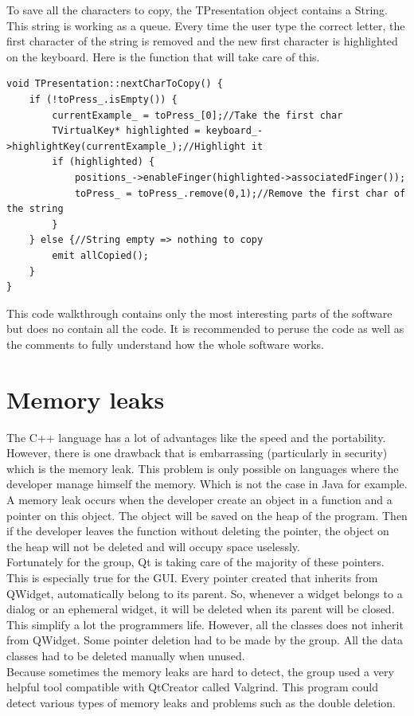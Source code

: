 To save all the characters to copy, the TPresentation object contains a String. This string is working as a queue. Every time the user type the correct letter, the first character of the string is removed and the new first character is highlighted on the keyboard. Here is the function that will take care of this.
\begin{lstlisting}
void TPresentation::nextCharToCopy() {
    if (!toPress_.isEmpty()) {
        currentExample_ = toPress_[0];//Take the first char
        TVirtualKey* highlighted = keyboard_->highlightKey(currentExample_);//Highlight it
        if (highlighted) {
            positions_->enableFinger(highlighted->associatedFinger());
            toPress_ = toPress_.remove(0,1);//Remove the first char of the string
        }
    } else {//String empty => nothing to copy
        emit allCopied();
    }
}
\end{lstlisting}

This code walkthrough contains only the most interesting parts of the software but does no contain all the code. It is recommended to peruse the code as well as the comments to fully understand how the whole software works.

\chapter{Memory leaks}
The C++ language has a lot of advantages like the speed and the portability. However, there is one drawback that is embarrassing (particularly in security) which is the memory leak. This problem is only possible on languages where the developer manage himself the memory. Which is not the case in Java for example. A memory leak occurs when the developer create an object in a function and a pointer on this object. The object will be saved on the heap of the program. Then if the developer leaves the function without deleting the pointer, the object on the heap will not be deleted and will occupy space uselessly. \\
Fortunately for the group, Qt is taking care of the majority of these pointers. This is especially true for the GUI. Every pointer created that inherits from QWidget, automatically belong to its parent. So, whenever a widget belongs to a dialog or an ephemeral widget, it will be deleted when its parent will be closed. This simplify a lot the programmers life. However, all the classes does not inherit from QWidget. Some pointer deletion had to be made by the group. All the data classes had to be deleted manually when unused.\\
Because sometimes the memory leaks are hard to detect, the group used a very helpful tool compatible with QtCreator called Valgrind. This program could detect various types of memory leaks and problems such as the double deletion.


